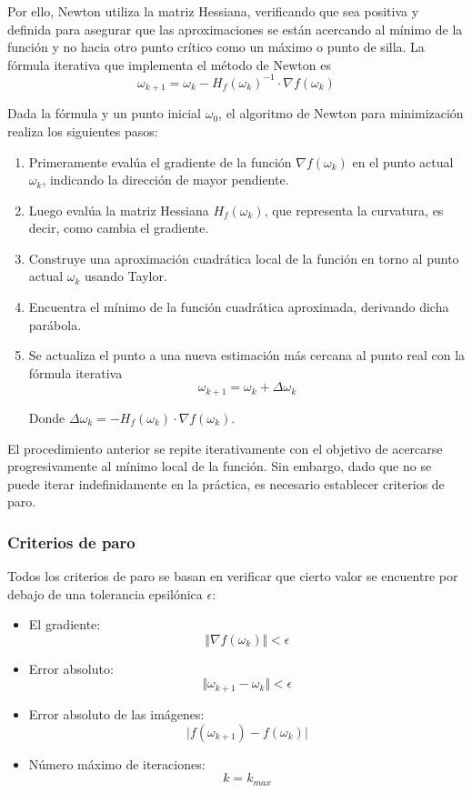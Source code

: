 \documentclass[conference]{IEEEtran}
\begin{document}
Por ello, Newton utiliza la matriz Hessiana, verificando que sea positiva y definida para asegurar que las aproximaciones se están acercando al mínimo de la función y no hacia otro punto crítico como un máximo o punto de silla. La fórmula iterativa que implementa el método de Newton es
\begin{equation}
    \omega_{k+1}=\omega_k-H_f(\omega_k)^{-1}\cdot\nabla f(\omega_k) \label{eq:newton-raphson}
\end{equation}

Dada la fórmula y un punto inicial $\omega_0$, el algoritmo de Newton para minimización realiza los siguientes pasos:

\begin{enumerate}
    \item Primeramente evalúa el gradiente de la función $\nabla f(\omega_k)$ en el punto actual $\omega_k$, indicando la dirección de mayor pendiente.
    \item Luego evalúa la matriz Hessiana $H_f(\omega_k)$, que representa la curvatura, es decir, como cambia el gradiente.
    \item Construye una aproximación cuadrática local de la función en torno al punto actual $\omega_k$ usando Taylor.
    \item Encuentra el mínimo de la función cuadrática aproximada, derivando dicha parábola.
    \item Se actualiza el punto a una nueva estimación más cercana al punto real con la fórmula iterativa 
    \begin{equation}
        \omega_{k+1}=\omega_k+\Delta \omega_k
    \end{equation}
    
    Donde $\Delta\omega_k=-H_f(\omega_k)\cdot\nabla f(\omega_k)$.
\end{enumerate}

El procedimiento anterior se repite iterativamente con el objetivo de acercarse progresivamente al mínimo local de la función. Sin embargo, dado que no se puede iterar indefinidamente en la práctica, es necesario establecer criterios de paro.

\subsubsection{Criterios de paro}
Todos los criterios de paro se basan en verificar que cierto valor se encuentre por debajo de una tolerancia epsilónica $\epsilon$:
\begin{itemize}
    \item El gradiente: $$\Vert \nabla f(\omega_{k})\Vert <\epsilon$$
    \item Error absoluto: $$\Vert \omega_{k+1}-\omega_{k}\Vert < \epsilon$$
    \item Error absoluto de las imágenes: $$\vert f(\omega_{k+1})-f(\omega_{k})\vert$$
    \item Número máximo de iteraciones:$$k=k_{max}$$
\end{itemize}
\end{document}
